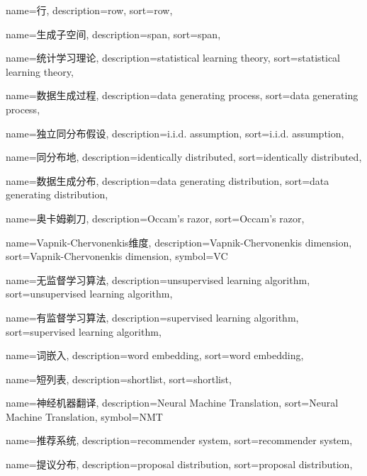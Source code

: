 {
  name=行,
  description={row},
  sort={row},
}

{
  name=生成子空间,
  description={span},
  sort={span},
}

{
  name=统计学习理论,
  description={statistical learning theory},
  sort={statistical learning theory},
}

{
  name=数据生成过程,
  description={data generating process},
  sort={data generating process},
}

{
  name=独立同分布假设,
  description={i.i.d. assumption},
  sort={i.i.d. assumption},
}

{
  name=同分布地,
  description={identically distributed},
  sort={identically distributed},
}

{
  name=数据生成分布,
  description={data generating distribution},
  sort={data generating distribution},
}

{
  name=奥卡姆剃刀,
  description={Occam's razor},
  sort={Occam's razor},
}

{
  name=Vapnik-Chervonenkis维度,
  description={Vapnik-Chervonenkis dimension},
  sort={Vapnik-Chervonenkis dimension},
  symbol={VC}
}

{
  name=无监督学习算法,
  description={unsupervised learning algorithm},
  sort={unsupervised learning algorithm},
}

{
  name=有监督学习算法,
  description={supervised learning algorithm},
  sort={supervised learning algorithm},
}

{
  name=词嵌入,
  description={word embedding},
  sort={word embedding},
}

{
  name=短列表,
  description={shortlist},
  sort={shortlist},
}

{
  name=神经机器翻译,
  description={Neural Machine Translation},
  sort={Neural Machine Translation},
  symbol={NMT}
}

{
  name=推荐系统,
  description={recommender system},
  sort={recommender system},
}

{
  name=提议分布,
  description={proposal distribution},
  sort={proposal distribution},
}

